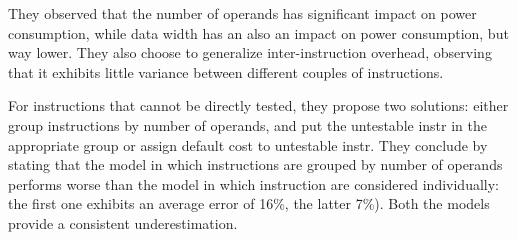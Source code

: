 They observed that the number of operands has significant impact on power consumption, while data width has an also an impact on power consumption, but way lower. They also choose to generalize inter-instruction overhead, observing that it exhibits little variance between different couples of instructions. \par 
For instructions that cannot be directly tested, they propose two solutions: either group instructions by number of operands, and put the untestable instr in the appropriate group or assign default cost to untestable instr. \newline
They conclude by stating that the model in which instructions are grouped by number of operands performs worse than the model in which instruction are considered individually: the first one exhibits an average error of 16\%, the latter 7\%). Both the models provide a consistent underestimation. \\[1in]


